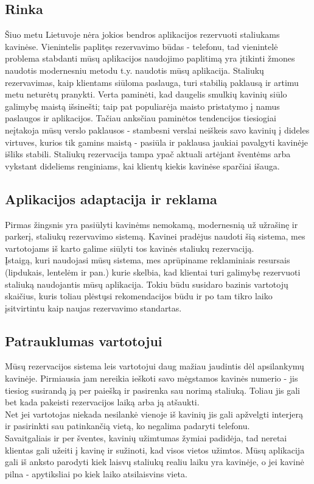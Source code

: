 \documentclass{VUMIFPSkursinis}
\begin{document}
\subsection{Rinka}
Šiuo metu Lietuvoje nėra jokios bendros aplikacijos rezervuoti staliukams kavinėse. Vienintelis paplitęs rezervavimo būdas - telefonu, tad vienintelė problema stabdanti mūsų aplikacijos naudojimo paplitimą yra įtikinti žmones naudotis modernesniu metodu t.y. naudotis mūsų aplikacija. Staliukų rezervavimas, kaip klientams siūloma paslauga, turi stabilią paklausą ir artimu metu neturėtų pranykti. Verta paminėti, kad daugelis smulkių kavinių siūlo galimybę maistą išsinešti; taip pat populiarėja maisto pristatymo į namus paslaugos ir aplikacijos. Tačiau anksčiau paminėtos tendencijos tiesiogiai neįtakoja mūsų verslo paklausos - stambesni verslai neiškeis savo kavinių į dideles virtuves, kurios tik gamins maistą - pasiūla ir paklausa jaukiai pavalgyti kavinėje išliks stabili. Staliukų rezervacija tampa ypač aktuali artėjant šventėms arba vykstant dideliems renginiams, kai klientų kiekis kavinėse sparčiai išauga.

\subsection{Aplikacijos adaptacija ir reklama}
Pirmas žingsnis yra pasiūlyti kavinėms nemokamą, modernesnią už užrašinę ir parkerį, staliukų rezervavimo sistemą. Kavinei pradėjus naudoti šią sistema, mes vartotojams iš karto galime siūlyti tos kavinės staliukų rezervaciją.\\
Įstaigą, kuri naudojasi mūsų sistema, mes aprūpiname reklaminiais resursais (lipdukais, lentelėm ir pan.) kurie skelbia, kad klientai turi galimybę rezervuoti staliuką naudojantis mūsų aplikacija. Tokiu būdu susidaro bazinis vartotojų skaičius, kuris toliau plėstųsi rekomendacijos būdu ir po tam tikro laiko įsitvirtintu kaip naujas rezervavimo standartas.

\subsection{Patrauklumas vartotojui}
Mūsų rezervacijos sistema leis vartotojui daug mažiau jaudintis dėl apsilankymų kavinėje. Pirmiausia jam nereikia ieškoti savo mėgstamos kavinės numerio - jis tiesiog susirandą ją per paiešką ir pasirenka sau norimą staliuką. Toliau jis gali bet kada pakeisti rezervacijos laiką arba ją atšaukti.\\
Net jei vartotojas niekada nesilankė vienoje iš kavinių jis gali apžvelgti interjerą ir pasirinkti sau patinkančią vietą, ko negalima padaryti telefonu.\\
Savaitgaliais ir per šventes, kavinių užimtumas žymiai padidėja, tad neretai klientas gali užeiti į kavinę ir sužinoti, kad visos vietos užimtos. Mūsų aplikacija gali iš anksto parodyti kiek laisvų staliukų realiu laiku yra kavinėje, o jei kavinė pilna - apytiksliai po kiek laiko atsilaisvins vieta.
\end{document}
